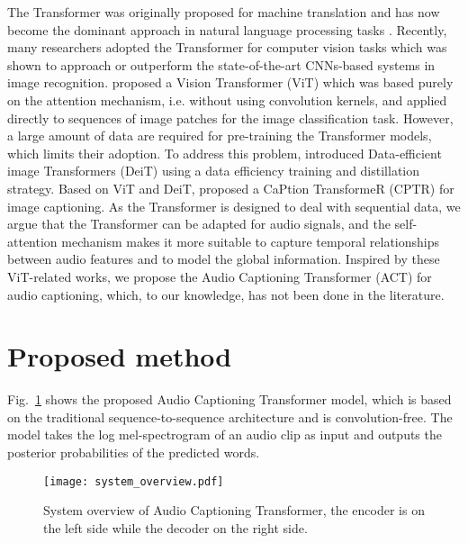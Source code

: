 \documentclass{article}
\begin{document}
\begin{sloppy}
The Transformer was originally proposed for machine translation and has now become the dominant approach in natural language processing tasks  \cite{vaswani2017attention}. Recently, many researchers adopted the Transformer for computer vision tasks which was shown to approach or outperform the state-of-the-art CNNs-based systems in image recognition. \citet{dosovitskiy2020image} proposed a Vision Transformer (ViT) which was based purely on the attention mechanism, i.e. without using convolution kernels, and applied directly to sequences of image patches for the image classification task. However, a large amount of data are required for pre-training the Transformer models, which limits their adoption. To address this problem, \citet{touvron2021training} introduced Data-efficient image Transformers (DeiT) using a data efficiency training and distillation strategy. Based on ViT and DeiT, \citet{liu2021cptr} proposed a CaPtion TransformeR (CPTR) for image captioning. As the Transformer is designed to deal with sequential data, we argue that the Transformer can be adapted for audio signals, and the self-attention mechanism makes it more suitable to capture temporal relationships between audio features and to model the global information. Inspired by these ViT-related works, we propose the Audio Captioning Transformer (ACT) for audio captioning, which, to our knowledge, has not been done in the literature. 


\section{Proposed method}
\label{sec:method}
Fig.~\ref{fig:system_overview} shows the proposed Audio Captioning Transformer model, which is based on the traditional sequence-to-sequence architecture and is convolution-free. The model takes the log mel-spectrogram of an audio clip as input and outputs the posterior probabilities of the predicted words. 

\begin{figure}[!t]
  \centering
  \texttt{[image: system\_overview.pdf]}
  \caption{System overview of Audio Captioning Transformer, the encoder is on the left side while the decoder on the right side.}
  \label{fig:system_overview}
\end{figure}


\end{sloppy}
\end{document}
